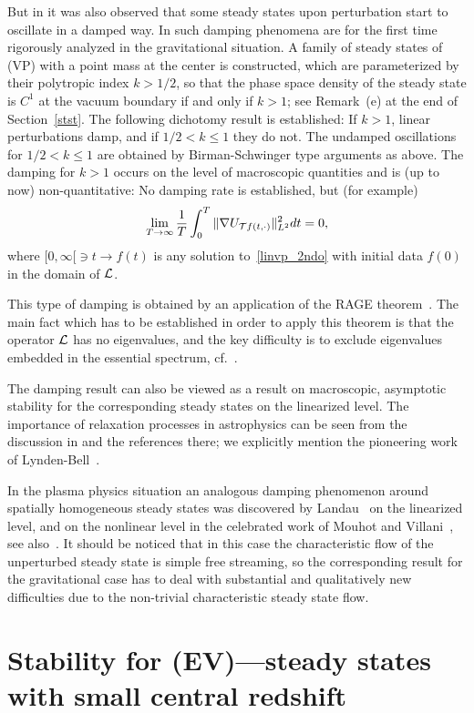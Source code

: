 \documentclass[11pt]{article}
\begin{document}
But in  \cite{RaRe2018} it was also observed that some steady states
upon perturbation start to oscillate in a damped way.
In \cite{HaReSchrStr2023} such damping phenomena are for the
first time rigorously analyzed in the gravitational situation.
A family of steady states of (VP) with a point mass at the center
is constructed, which are parameterized by their polytropic index $k>1/2$, 
so that the phase space density of the steady state is $C^1$ at the
vacuum boundary if and only if $k>1$; see Remark~(e) at the end
of Section~\ref{stst}. 
The following dichotomy result is established:
If $k>1$, linear perturbations damp, and if $1/2< k\le1$ they do not.
The undamped oscillations for $1/2< k\le 1$ are obtained by Birman-Schwinger
type arguments as above.
The damping for $k>1$ occurs on the level of macroscopic quantities and is
(up to now)
non-quantitative: No damping rate is established, but (for example)
\[ 
\lim_{T\to\infty}\frac{1}{T}\int_0^T\|\nabla U_{{\cal T} f(t,\cdot)}\|_{L^2}^2 dt = 0,
\]
where
$[0,\infty[\ni t\to f(t)$ is any solution to~\eqref{linvp_2ndo}
with initial data $f(0)$ in the domain of ${\cal L}$.

This type of damping is obtained by an application of the
RAGE theorem~\cite{CyFrKiSi}. The main fact which has to be
established in order to apply this theorem is that the operator
${\cal L}$ has no eigenvalues, and the key difficulty is to exclude
eigenvalues embedded in the essential spectrum,
cf.~\cite[Theorem~4.5]{HaReSchrStr2023}.

The damping result can also be viewed as a result on macroscopic, asymptotic
stability for the corresponding steady states on the linearized level.
The importance of relaxation processes in astrophysics can be seen from
the discussion in \cite{BiTr} and the references there; we explicitly mention
the pioneering work of {\sc Lynden-Bell}~\cite{LB1962,LB1967}.

In the plasma physics situation an analogous damping phenomenon
around spatially homogeneous steady states was discovered by
{\sc Landau}~\cite{Landau1946} on the linearized level, and
on the nonlinear level in the celebrated work of
{\sc Mouhot} and {\sc Villani}~\cite{MoVi2011},
see also~\cite{BeMaMo2016,GrNgRo2020}.
It should be noticed that in this case the characteristic flow of the
unperturbed steady state is simple free streaming,
so the corresponding result for the gravitational case
has to deal with substantial and qualitatively new difficulties
due to the non-trivial characteristic steady state flow. 
%
%
%
\section{Stability for (EV)---steady states with small central redshift}
\label{stabkappasmall}
\setcounter{equation}{0}
%
%
\end{document}
